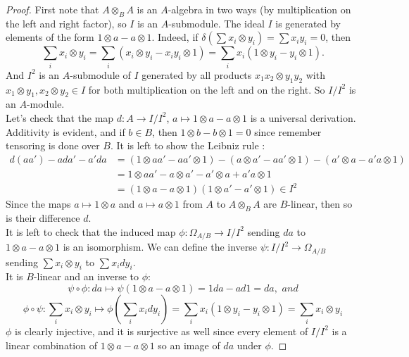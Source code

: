 \documentclass{article}
\theoremstyle{plain}
\theoremstyle{definition}
\begin{document}
\begin{proof}
    First note that $A\otimes_B A$ is an $A$-algebra in two ways (by multiplication on the left and right factor), so $I$ is an $A$-submodule.
    The ideal $I$ is generated by elements of the form $1\otimes a- a\otimes 1$. Indeed, if $\delta(\sum x_i\otimes y_i)= \sum x_iy_i=0$, then 
    $$ \sum_i x_i\otimes y_i = \sum_i (x_i \otimes y_i - x_iy_i\otimes 1) = \sum_i x_i(1\otimes y_i -y_i \otimes 1).$$
    And $I^2$ is an $A$-submodule of $I$ generated by all products $x_1x_2\otimes y_1y_2$ with $x_1\otimes y_1,x_2\otimes y_2\in I$ for both multiplication on the left and on the right. So $I/I^2$ is an $A$-module. \\
    Let's check that the map $d: A\rightarrow I/I^2$, $a\mapsto 1\otimes a - a \otimes 1$ is a universal derivation.
    Additivity is evident, and if $b\in B$, then $1\otimes b-b\otimes 1 = 0$ since remember tensoring is done over $B$.
    It is left to show the Leibniz rule :
    \begin{equation*}
    \begin{split}
        d(aa') - ada'-a'da &=  (1\otimes aa' -aa' \otimes 1) - (a\otimes a'-aa'\otimes 1) -(a' \otimes a - a'a \otimes 1) \\
        & = 1\otimes aa' - a\otimes a' -a'\otimes a + a'a \otimes 1\\
        & = (1\otimes a - a\otimes1)(1\otimes a'- a'\otimes 1) \in I^2
    \end{split}
    \end{equation*}
    Since the maps $a\mapsto 1\otimes a$ and $a\mapsto a\otimes 1$ from $A$ to $A\otimes_B A$ are $B$-linear, then so is their difference $d$.\\
    It is left to check that the induced map $\phi : \Omega_{A/B}\rightarrow I/I^2$ sending $da$ to $1\otimes a-a\otimes 1$ is an isomorphism. 
    We can define the inverse $\psi :I/I^2\rightarrow\Omega_{A/B}$ sending $\sum x_i\otimes y_i$ to $\sum x_idy_i$. \\
    It is $B$-linear and an inverse to $\phi$:
    $$\psi\circ\phi: da \mapsto\psi(1\otimes a-a\otimes 1) = 1da - ad1 = da, \textit{ and}$$
    $$\phi\circ\psi : \sum_ix_i\otimes y_i \mapsto \phi(\sum_ix_idy_i) = \sum_i x_i(1\otimes y_i - y_i\otimes 1) = \sum_ix_i\otimes y_i$$
    $\phi$ is clearly injective, and it is surjective as well since every element of $I/I^2$ is a linear combination of $1\otimes a-a\otimes 1$ so an image of $da$ under $\phi$.
\end{proof}
\end{document}
